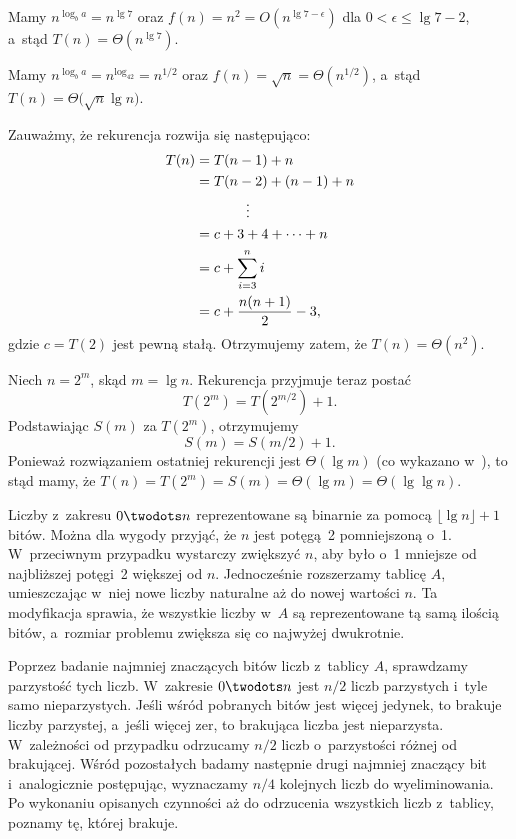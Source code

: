 \subproblem %
Mamy $n^{\log_ba}=n^{\lg7}$ oraz $f(n)=n^2=O(n^{\lg7-\epsilon})$ dla $0<\epsilon\le\lg7-2$, a~stąd $T(n)=\Theta(n^{\lg7})$.

\subproblem %
Mamy $n^{\log_ba}=n^{\log_42}=n^{1/2}$ oraz $f(n)=\sqrt{n}=\Theta(n^{1/2})$, a~stąd $T(n)=\Theta\bigl(\!\sqrt{n}\lg n\bigr)$.

\subproblem %
Zauważmy, że rekurencja rozwija się następująco:
\begin{align*}
	T(n) &= T(n-1)+n \\
	&= T(n-2)+(n-1)+n \\
	&\hspace{.5in}\vdots \\
	&= c+3+4+\dots+n \\
	&= c+\sum_{i=3}^ni \\
	&= c+\frac{n(n+1)}{2}-3,
\end{align*}
gdzie $c=T(2)$ jest pewną stałą. Otrzymujemy zatem, że $T(n)=\Theta(n^2)$.

\subproblem %
Niech $n=2^m$, skąd $m=\lg n$. Rekurencja przyjmuje teraz postać
\[
	T(2^m) = T(2^{m/2})+1.
\]
Podstawiając $S(m)$ za $T(2^m)$, otrzymujemy
\[
	S(m) = S(m/2)+1.
\]
Ponieważ rozwiązaniem ostatniej rekurencji jest $\Theta(\lg m)$ (co wykazano w~), to stąd mamy, że $T(n)=T(2^m)=S(m)=\Theta(\lg m)=\Theta(\lg\lg n)$.

Liczby z~zakresu $0\twodots n$ reprezentowane są binarnie za pomocą $\lfloor\lg n\rfloor+1$ bitów. Można dla wygody przyjąć, że $n$ jest potęgą~2 pomniejszoną o~1. W~przeciwnym przypadku wystarczy zwiększyć $n$, aby było o~1 mniejsze od najbliższej potęgi~2 większej od $n$. Jednocześnie rozszerzamy tablicę $A$, umieszczając w~niej nowe liczby naturalne aż do nowej wartości $n$. Ta modyfikacja sprawia, że wszystkie liczby w~$A$ są reprezentowane tą samą ilością bitów, a~rozmiar problemu zwiększa się co najwyżej dwukrotnie.

Poprzez badanie najmniej znaczących bitów liczb z~tablicy $A$, sprawdzamy parzystość tych liczb. W~zakresie $0\twodots n$ jest $n/2$ liczb parzystych i~tyle samo nieparzystych. Jeśli wśród pobranych bitów jest więcej jedynek, to brakuje liczby parzystej, a~jeśli więcej zer, to brakująca liczba jest nieparzysta. W~zależności od przypadku odrzucamy $n/2$ liczb o~parzystości różnej od brakującej. Wśród pozostałych badamy następnie drugi najmniej znaczący bit i~analogicznie postępując, wyznaczamy $n/4$ kolejnych liczb do wyeliminowania. Po wykonaniu opisanych czynności aż do odrzucenia wszystkich liczb z~tablicy, poznamy tę, której brakuje.

